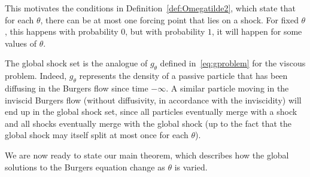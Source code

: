 \documentclass[AHL,Unicode,longabstracts]{cedram}
\begin{document}
This motivates the conditions in Definition~\ref{def:Omegatilde2}, which state that for each $\theta$, there can be at most one forcing point that lies on a shock. For fixed $\theta$, this happens with probability $0$, but with probability $1$, it will happen for some values of $\theta$.

The global shock set is the analogue of $g_{\theta}$ defined in~\eqref{eq:gproblem} for the viscous problem. Indeed, $g_{\theta}$ represents the density of a passive particle that has been diffusing in the Burgers flow since time $-\infty$. A similar particle moving in the inviscid Burgers flow (without diffusivity, in accordance with the inviscidity) will end up in the global shock set, since all particles eventually merge with a shock and all shocks eventually merge with the global shock (up to the fact that the global shock may itself split at most once for each $\theta$).

We are now ready to state our main theorem, which describes how the global solutions to the Burgers equation change as $\theta$ is varied.
\end{document}
